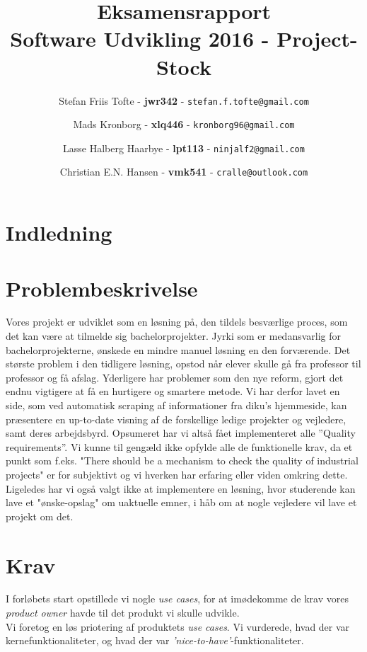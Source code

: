 \documentclass[12pt]{article}
\title{
  \vspace{3cm}
  \Huge{Eksamensrapport} \\
  \Large{Software Udvikling 2016 - Project-Stock}
}
\author{
	\Large{Stefan Friis Tofte} - \textbf{jwr342} - \texttt{stefan.f.tofte@gmail.com}
	\and
	\Large{Mads Kronborg} - \textbf{xlq446} - \texttt{kronborg96@gmail.com}
	\and
	\Large{Lasse Halberg Haarbye} - \textbf{lpt113} - \texttt{ninjalf2@gmail.com}
	\and
	\Large{Christian E.N. Hansen} - \textbf{vmk541} - \texttt{cralle@outlook.com}
}
\def \ColourPDF {../include/ku-farve}
\def \TitlePDF {../include/ku-en}  %
\begin{document}


\clearpage\maketitle
\thispagestyle{empty}

\newpage
\tableofcontents
\newpage

\section{Indledning}
\label{sec:indledning}

\section{Problembeskrivelse}
\label{sec:problem}
Vores projekt er udviklet som en løsning på, den tildels besværlige proces, som det kan være at tilmelde sig bachelorprojekter. Jyrki som er medansvarlig for bachelorprojekterne, ønskede en mindre manuel løsning en den forværende. Det største problem i den tidligere løsning, opstod når elever skulle gå fra professor til professor og få afslag. Yderligere har problemer som den nye reform, gjort det endnu vigtigere at få en hurtigere og smartere metode. 
Vi har derfor lavet en side, som ved automatisk scraping af informationer fra diku's hjemmeside, kan præsentere en up-to-date visning af de forskellige ledige projekter og vejledere, samt deres arbejdsbyrd. Opsumeret har vi altså fået implementeret alle ''Quality requirements''. Vi kunne til gengæld ikke opfylde alle de funktionelle krav, da et punkt som f.eks. "There should be a mechanism to check the quality of industrial projects" er for subjektivt og vi hverken har erfaring eller viden omkring dette. Ligeledes har vi også valgt ikke at implementere en løsning, hvor studerende kan lave et "ønske-opslag" om uaktuelle emner, i håb om at nogle vejledere vil lave et projekt om det. 

\section{Krav}
I forløbets start opstillede vi nogle \textit{use cases}, for at imødekomme de krav vores \textit{product owner} havde til det produkt vi skulle udvikle. \\
Vi foretog en løs priotering af produktets \textit{use cases}. Vi vurderede, hvad der var kernefunktionaliteter, og hvad der var \textit{'nice-to-have'}-funktionaliteter.
\end{document}
